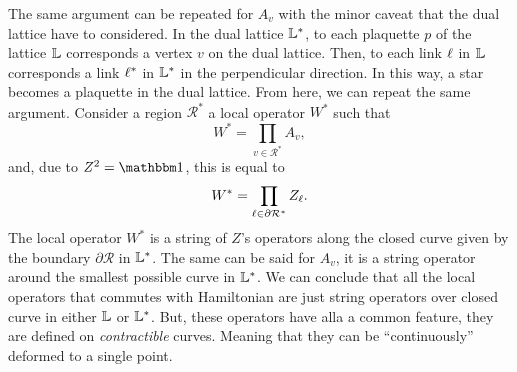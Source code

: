The same argument can be repeated for $A_v$ with the minor caveat that the dual lattice have to considered.
In the dual lattice $\mathbb{L}^{\ast}$, to each plaquette $p$ of the lattice $\mathbb{L}$ corresponds a vertex $v$ on the dual lattice.
Then, to each link $\ell$ in $\mathbb{L}$ corresponds a link $\ell^{\ast}$ in $\mathbb{L}^{\ast}$ in the perpendicular direction.
In this way, a star becomes a plaquette in the dual lattice.
From here, we can repeat the same argument.
Consider a region $\mathcal{R}^{\ast}$ a local operator $W^{\ast}$ such that
\begin{equation}
    W^{\ast} = \prod_{v \in \mathcal{R}^{\ast}} A_v,
\end{equation}
and, due to $Z^2 = \identity$, this is equal to
\begin{equation}
    W^{\ast} = \prod_{\ell \in \partial \mathcal{R}^{\ast}} Z_{\ell}.
\end{equation}
The local operator $W^{\ast}$ is a string of $Z$'s operators along the closed curve given by the boundary $\partial \mathcal{R}$ in $\mathbb{L}^{\ast}$.
The same can be said for $A_v$, it is a string operator around the smallest possible curve in $\mathbb{L}^{\ast}$.
We can conclude that all the local operators that commutes with Hamiltonian are just string operators over closed curve in either $\mathbb{L}$ or $\mathbb{L}^{\ast}$.
But, these operators have alla a common feature, they are defined on \emph{contractible} curves.
Meaning that they can be ``continuously'' deformed to a single point.

\begin{figure}[t]
\end{figure}


